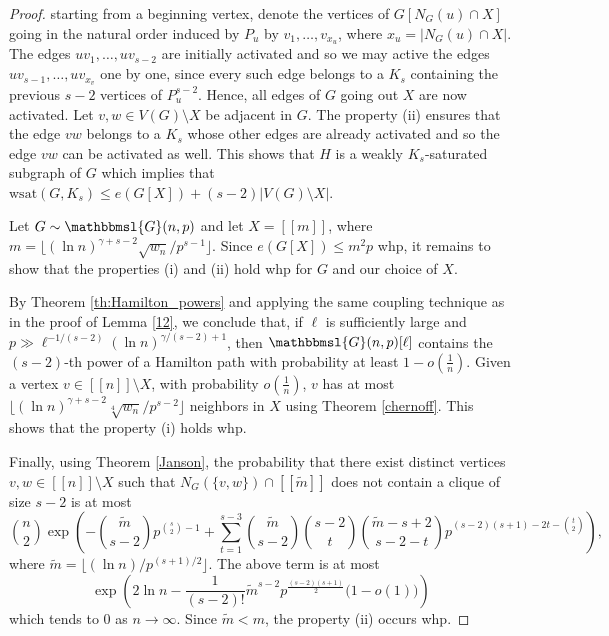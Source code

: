 \documentclass[hidelinks, 11pt]{article}
\theoremstyle{plain}
\theoremstyle{definition}
\begin{document}
\begin{proof}
starting from   a beginning   vertex,
denote the vertices of $G[N_G(u)\cap X]$  going in the natural order induced
by $P_u$ by
$v_1, \ldots, v_{x_u}$, where $x_u=|N_G(u)\cap X|$.  The edges  $uv_1,\ldots,uv_{s-2}$ are initially    activated and so
we may active  the edges $uv_{s-1},  \ldots, uv_{x_v}$ one by one,  since   every such edge belongs to a $K_s$  containing the previous $s-2$ vertices of $P_u^{s-2}$.
Hence,  all edges of $G$ going out   $X$   are now activated. Let $v,w\in V(G)\setminus X$ be adjacent in $G$. The property (ii) ensures that the edge  $vw$   belongs to a   $K_s$ whose  other
edges    are already
activated and so the edge $vw$ can be activated as well. This shows that  $H$ is  a weakly $K_s$-saturated subgraph of  $G$ which implies that
$\mathrm{wsat}(G, K_s)\leq e(G[X])+(s-2)|V(G)\setminus X|$.
	


Let $G\sim\mathbbmsl{G}(n, p)$ and  let  $X=[\![m]\!]$, where $m=\lfloor(\ln n)^{\gamma+s-2}\sqrt{w_n}/p^{s-1}\rfloor$.   Since   $e(G[X])\leq m^2p$ whp, it remains to show that  the properties   (i) and (ii) hold  whp  for $G$ and our choice of $X$.



By Theorem \ref{th:Hamilton_powers} and applying the same coupling technique  as in the proof of Lemma \ref{12},  we   conclude    that,   if    $\ell$ is sufficiently large and     $p\gg\ell^{-1/(s-2)}(\ln n)^{\gamma/(s-2)+1}$, then $\mathbbmsl{G}(n,p)[\ell]$ contains the $(s-2)$-th power of a Hamilton path with probability at least $1-o(\tfrac{1}{n})$. Given a vertex $v\in[\![n]\!]\setminus X$, with probability $o(\tfrac{1}{n})$, $v$ has  at most  $\lfloor(\ln n)^{\gamma+s-2}\sqrt[4]{w_n}/p^{s-2}\rfloor$ neighbors in $X$ using  Theorem \ref{chernoff}. This shows that  the property     (i) holds whp.


Finally, using   Theorem \ref{Janson}, the probability that  there exist distinct  vertices  $v,w\in[\![n]\!]\setminus X$ such that $N_G(\{v, w\})\cap [\![\widetilde m]\!]$ does not   contain  a clique of size $s-2$   is at most
$${n\choose 2}\exp\left(-{\widetilde m\choose s-2}p^{{s\choose 2}-1}+\sum_{t=1}^{s-3}{\widetilde m\choose s-2}{s-2\choose t}{\widetilde m-s+2\choose s-2-t}p^{(s-2)(s+1)-2t-{t\choose 2}}\right),$$ where $\widetilde{m}=\lfloor (\ln n)/p^{(s+1)/2}\rfloor$. The above term is at most
$$\exp\left(2\ln n-\frac{1}{(s-2)!}\widetilde m^{s-2}p^{\frac{(s-2)(s+1)}{2}}\big(1-o(1)\big)\right)$$ which tends to $0$ as $n\to\infty$. Since $\widetilde{m}<m$,  the property  (ii) occurs  whp.
\end{proof}
\end{document}
